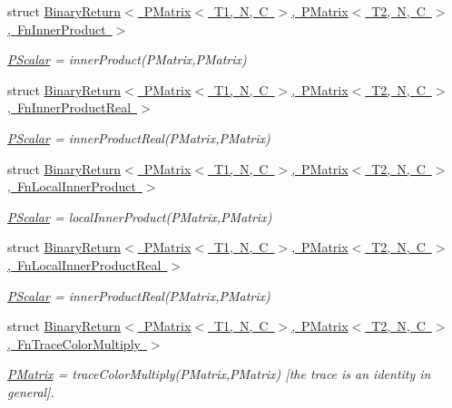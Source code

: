 \begin{DoxyCompactItemize}
struct \mbox{\hyperlink{structENSEM_1_1BinaryReturn_3_01PMatrix_3_01T1_00_01N_00_01C_01_4_00_01PMatrix_3_01T2_00_01N_00_073dfb745dc2b12345e8e4de199894c8}{Binary\+Return$<$ P\+Matrix$<$ T1, N, C $>$, P\+Matrix$<$ T2, N, C $>$, Fn\+Inner\+Product $>$}}
\begin{DoxyCompactList}\small\item\em \mbox{\hyperlink{classENSEM_1_1PScalar}{P\+Scalar}} = inner\+Product(\+P\+Matrix,\+P\+Matrix) \end{DoxyCompactList}\item 
struct \mbox{\hyperlink{structENSEM_1_1BinaryReturn_3_01PMatrix_3_01T1_00_01N_00_01C_01_4_00_01PMatrix_3_01T2_00_01N_00_b7141a669b31fb2094aee5e58df04a01}{Binary\+Return$<$ P\+Matrix$<$ T1, N, C $>$, P\+Matrix$<$ T2, N, C $>$, Fn\+Inner\+Product\+Real $>$}}
\begin{DoxyCompactList}\small\item\em \mbox{\hyperlink{classENSEM_1_1PScalar}{P\+Scalar}} = inner\+Product\+Real(\+P\+Matrix,\+P\+Matrix) \end{DoxyCompactList}\item 
struct \mbox{\hyperlink{structENSEM_1_1BinaryReturn_3_01PMatrix_3_01T1_00_01N_00_01C_01_4_00_01PMatrix_3_01T2_00_01N_00_21d827057038aa42c2c8bc00c90c1d07}{Binary\+Return$<$ P\+Matrix$<$ T1, N, C $>$, P\+Matrix$<$ T2, N, C $>$, Fn\+Local\+Inner\+Product $>$}}
\begin{DoxyCompactList}\small\item\em \mbox{\hyperlink{classENSEM_1_1PScalar}{P\+Scalar}} = local\+Inner\+Product(\+P\+Matrix,\+P\+Matrix) \end{DoxyCompactList}\item 
struct \mbox{\hyperlink{structENSEM_1_1BinaryReturn_3_01PMatrix_3_01T1_00_01N_00_01C_01_4_00_01PMatrix_3_01T2_00_01N_00_c0701524dc0f1159f2f6c12312f494be}{Binary\+Return$<$ P\+Matrix$<$ T1, N, C $>$, P\+Matrix$<$ T2, N, C $>$, Fn\+Local\+Inner\+Product\+Real $>$}}
\begin{DoxyCompactList}\small\item\em \mbox{\hyperlink{classENSEM_1_1PScalar}{P\+Scalar}} = inner\+Product\+Real(\+P\+Matrix,\+P\+Matrix) \end{DoxyCompactList}\item 
struct \mbox{\hyperlink{structENSEM_1_1BinaryReturn_3_01PMatrix_3_01T1_00_01N_00_01C_01_4_00_01PMatrix_3_01T2_00_01N_00_d90c323b0eef8bf9c5abb3303bff0c7e}{Binary\+Return$<$ P\+Matrix$<$ T1, N, C $>$, P\+Matrix$<$ T2, N, C $>$, Fn\+Trace\+Color\+Multiply $>$}}
\begin{DoxyCompactList}\small\item\em \mbox{\hyperlink{classENSEM_1_1PMatrix}{P\+Matrix}} = trace\+Color\+Multiply(\+P\+Matrix,\+P\+Matrix) \mbox{[}the trace is an identity in general\mbox{]}. \end{DoxyCompactList}\item 

\end{DoxyCompactItemize}
